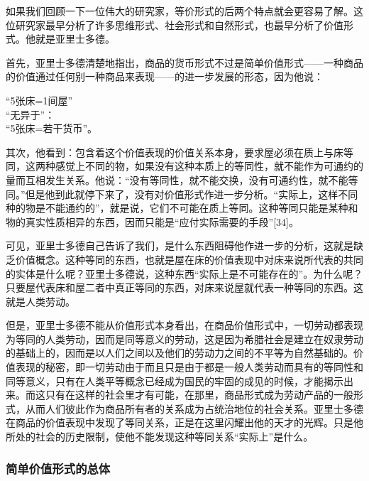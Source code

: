 \documentclass{ctexbook}
\begin{document}
            如果我们回顾一下一位伟大的研究家，等价形式的后两个特点就会更容易了解。这位研究家最早分析了许多思维形式、社会形式和自然形式，也最早分析了价值形式。他就是亚里士多德。
            
            首先，亚里士多德清楚地指出，商品的货币形式不过是简单价值形式——一种商品的价值通过任何别一种商品来表现——的进一步发展的形态，因为他说：
            
            \begin{center}
                “5张床=1间屋” \\
                “无异于”：\\
                “5张床=若干货币”。
            \end{center}
            
            
            其次，他看到：包含着这个价值表现的价值关系本身，要求屋必须在质上与床等同，这两种感觉上不同的物，如果没有这种本质上的等同性，就不能作为可通约的量而互相发生关系。他说：“没有等同性，就不能交换，没有可通约性，就不能等同。”但是他到此就停下来了，没有对价值形式作进一步分析。“实际上，这样不同种的物是不能通约的”，就是说，它们不可能在质上等同。这种等同只能是某种和物的真实性质相异的东西，因而只能是“应付实际需要的手段”[34]。
            
            可见，亚里士多德自己告诉了我们，是什么东西阻碍他作进一步的分析，这就是缺乏价值概念。这种等同的东西，也就是屋在床的价值表现中对床来说所代表的共同的实体是什么呢？亚里士多德说，这种东西“实际上是不可能存在的”。为什么呢？只要屋代表床和屋二者中真正等同的东西，对床来说屋就代表一种等同的东西。这就是人类劳动。
            
            但是，亚里士多德不能从价值形式本身看出，在商品价值形式中，一切劳动都表现为等同的人类劳动，因而是同等意义的劳动，这是因为希腊社会是建立在奴隶劳动的基础上的，因而是以人们之间以及他们的劳动力之间的不平等为自然基础的。价值表现的秘密，即一切劳动由于而且只是由于都是一般人类劳动而具有的等同性和同等意义，只有在人类平等概念已经成为国民的牢固的成见的时候，才能揭示出来。而这只有在这样的社会里才有可能，在那里，商品形式成为劳动产品的一般形式，从而人们彼此作为商品所有者的关系成为占统治地位的社会关系。亚里士多德在商品的价值表现中发现了等同关系，正是在这里闪耀出他的天才的光辉。只是他所处的社会的历史限制，使他不能发现这种等同关系“实际上”是什么。

            
            \subsubsection{简单价值形式的总体}
\end{document}
